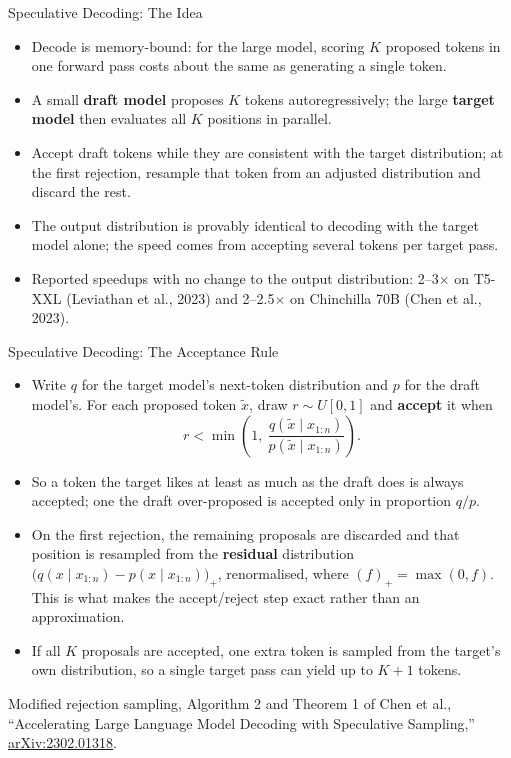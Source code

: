 \begin{frame}{Speculative Decoding: The Idea}
  \begin{itemize}\itemsep0.5em
    \item[\textcolor{red}{$\blacktriangleright$}] Decode is memory-bound: for the large model, scoring $K$ proposed tokens in one forward pass costs about the same as generating a single token.
    \item[\textcolor{red}{$\blacktriangleright$}] A small \textbf{draft model} proposes $K$ tokens autoregressively; the large \textbf{target model} then evaluates all $K$ positions in parallel.
    \item[\textcolor{red}{$\blacktriangleright$}] Accept draft tokens while they are consistent with the target distribution; at the first rejection, resample that token from an adjusted distribution and discard the rest.
    \item[\textcolor{red}{$\blacktriangleright$}] The output distribution is provably identical to decoding with the target model alone; the speed comes from accepting several tokens per target pass.
    \item[\textcolor{red}{$\blacktriangleright$}] Reported speedups with no change to the output distribution: 2--3$\times$ on T5-XXL (Leviathan et al., 2023) and 2--2.5$\times$ on Chinchilla 70B (Chen et al., 2023).
  \end{itemize}
\end{frame}

\begin{frame}{Speculative Decoding: The Acceptance Rule}
  \begin{itemize}\itemsep0.3em
    \item[\textcolor{red}{$\blacktriangleright$}] Write $q$ for the target model's next-token distribution and $p$ for the draft model's. For each proposed token $\tilde{x}$, draw $r \sim U[0,1]$ and \textbf{accept} it when
      \[
        r < \min\!\left(1,\ \frac{q(\tilde{x} \mid x_{1:n})}{p(\tilde{x} \mid x_{1:n})}\right).
      \]
    \item[\textcolor{red}{$\blacktriangleright$}] So a token the target likes at least as much as the draft does is always accepted; one the draft over-proposed is accepted only in proportion $q/p$.
    \item[\textcolor{red}{$\blacktriangleright$}] On the first rejection, the remaining proposals are discarded and that position is resampled from the \textbf{residual} distribution $\big(q(x \mid x_{1:n}) - p(x \mid x_{1:n})\big)_{+}$, renormalised, where $(f)_{+} = \max(0, f)$. This is what makes the accept/reject step exact rather than an approximation.
    \item[\textcolor{red}{$\blacktriangleright$}] If all $K$ proposals are accepted, one extra token is sampled from the target's own distribution, so a single target pass can yield up to $K+1$ tokens.
  \end{itemize}
  \vspace{0.1em}
  {\scriptsize Modified rejection sampling, Algorithm 2 and Theorem 1 of Chen et al., ``Accelerating Large Language Model Decoding with Speculative Sampling,'' \href{https://arxiv.org/abs/2302.01318}{arXiv:2302.01318}.}
\end{frame}


